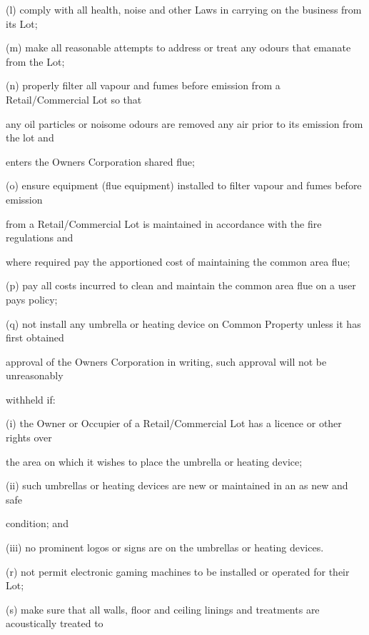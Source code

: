\documentclass{article}
\begin{document}
{\fontsize{9.962}{1}(l) comply with all health, noise and other Laws in carrying on the business from its Lot; }

{\fontsize{9.962}{1}(m) make all reasonable attempts to address or treat any odours that emanate from the Lot; }

{\fontsize{9.962}{1}(n) properly filter all vapour and fumes before emission from a Retail/Commercial Lot so that }

{\fontsize{10.02}{1}any oil particles or noisome odours are removed any air prior to its emission from the lot and }

{\fontsize{10.02}{1}enters the Owners Corporation shared flue; }

{\fontsize{9.962}{1}(o) ensure equipment (flue equipment) installed to filter vapour and fumes before emission }

{\fontsize{10.02}{1}from a Retail/Commercial Lot is maintained in accordance with the fire regulations and }

{\fontsize{10.02}{1}where required pay the apportioned cost of maintaining the common area flue; }

{\fontsize{9.962}{1}(p) pay all costs incurred to clean and maintain the common area flue on a user pays policy; }

{\fontsize{9.962}{1}(q) not install any umbrella or heating device on Common Property unless it has first obtained }

{\fontsize{10.02}{1}approval of the Owners Corporation in writing, such approval will not be unreasonably }

{\fontsize{10.02}{1}withheld if: }

{\fontsize{9.962}{1}(i) the Owner or Occupier of a Retail/Commercial Lot has a licence or other rights over }

{\fontsize{10.02}{1}the area on which it wishes to place the umbrella or heating device; }

{\fontsize{9.962}{1}(ii) such umbrellas or heating devices are new or maintained in an as new and safe }

{\fontsize{10.02}{1}condition; and }

{\fontsize{9.962}{1}(iii) no prominent logos or signs are on the umbrellas or heating devices. }

{\fontsize{9.962}{1}(r) not permit electronic gaming machines to be installed or operated for their Lot; }

{\fontsize{9.962}{1}(s) make sure that all walls, floor and ceiling linings and treatments are acoustically treated to }
\end{document}
